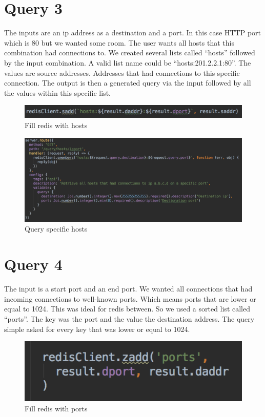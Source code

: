 \section{Query 3}
The inputs are an ip address as a destination and a port. In this case HTTP port which is 80 but we wanted some room. The user wants all hosts that this combination had connections to. We created several lists called “hosts” followed by the input combination. A valid list name could be “hosts:201.2.2.1:80”. The values are source addresses. Addresses that had connections to this specific connection. The output is then a generated query via the input followed by all the values within this specific list.

  \begin{figure}[htb!]
	\centerline{\includegraphics[width=1.0\textwidth]{resources/solution2-6.png}}
	\caption{Fill redis with hosts}
	\label{query3}
\end{figure}

\begin{figure}[htb!]
	\centerline{\includegraphics[width=1.0\textwidth]{resources/solution2-7.png}}
	\caption{Query specific hosts}
	\label{query33}
\end{figure}

\section{Query 4}
The input is a start port and an end port. We wanted all connections that had incoming connections to well-known ports. Which means ports that are lower or equal to 1024. This was ideal for redis between. So we used a sorted list called “ports”. The key was the port and the value the destination address. The query simple asked for every key that was lower or equal to 1024.

  \begin{figure}[htb!]
	\centerline{\includegraphics[width=1.0\textwidth]{resources/solution2-8.png}}
	\caption{Fill redis with ports}
	\label{query4}
\end{figure}

